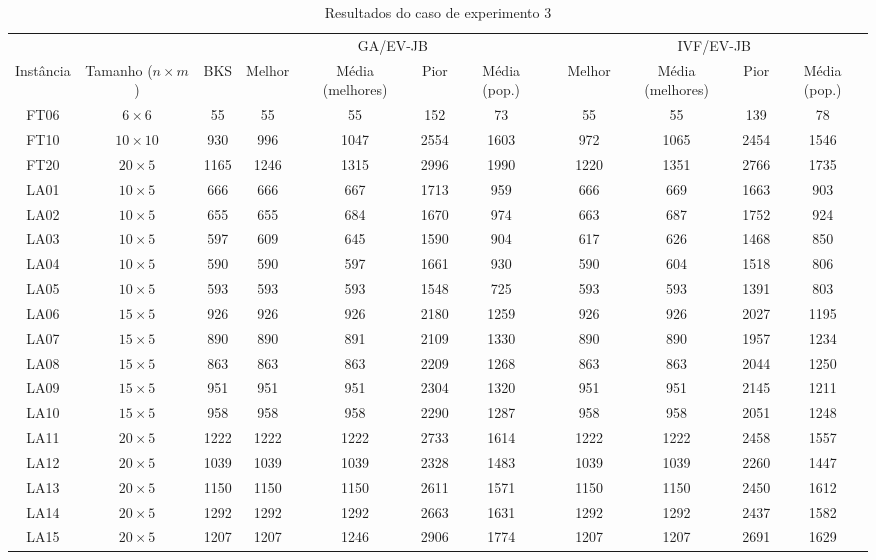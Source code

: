 \begin{sidewaystable}
\caption{Resultados do caso de experimento 3}
\centering
\label{experimento3}
\begin{tabular}{cccccccccccc}
\toprule
& & & \multicolumn{4}{c}{GA/EV-JB} & & \multicolumn{4}{c}{IVF/EV-JB} \\
\cmidrule(c){4-7}
\cmidrule(c){9-12}
Inst\^{a}ncia & Tamanho ($n \times m$) & BKS & Melhor & M\'{e}dia (melhores) & Pior & M\'{e}dia (pop.) & & Melhor & M\'{e}dia (melhores) & Pior & M\'{e}dia (pop.) \\
\midrule
FT06 & $6 \times 6$ & 55 & 55 & 55 & 152 & 73 & & 55 & 55 & 139 & 78 \\
FT10 & $10 \times 10$ & 930 & 996 & 1047 & 2554 & 1603 & & 972 & 1065 & 2454 & 1546 \\
FT20 & $20 \times 5$ & 1165 & 1246 & 1315 & 2996 & 1990 & & 1220 & 1351 & 2766 & 1735 \\
LA01 & $10 \times 5$ & 666 & 666 & 667 & 1713 & 959 & & 666 & 669 & 1663 & 903 \\
LA02 & $10 \times 5$ & 655 & 655 & 684 & 1670 & 974 & & 663 & 687 & 1752 & 924 \\
LA03 & $10 \times 5$ & 597 & 609 & 645 & 1590 & 904 & & 617 & 626 & 1468 & 850 \\
LA04 & $10 \times 5$ & 590 & 590 & 597 & 1661 & 930 & & 590 & 604 & 1518 & 806 \\
LA05 & $10 \times 5$ & 593 & 593 & 593 & 1548 & 725 & & 593 & 593 & 1391 & 803 \\
LA06 & $15 \times 5$ & 926 & 926 & 926 & 2180 & 1259 & & 926 & 926 & 2027 & 1195 \\
LA07 & $15 \times 5$ & 890 & 890 & 891 & 2109 & 1330 & & 890 & 890 & 1957 & 1234 \\
LA08 & $15 \times 5$ & 863 & 863 & 863 & 2209 & 1268 & & 863 & 863 & 2044 & 1250 \\
LA09 & $15 \times 5$ & 951 & 951 & 951 & 2304 & 1320 & & 951 & 951 & 2145 & 1211 \\
LA10 & $15 \times 5$ & 958 & 958 & 958 & 2290 & 1287 & & 958 & 958 & 2051 & 1248 \\
LA11 & $20 \times 5$ & 1222 & 1222 & 1222 & 2733 & 1614 & & 1222 & 1222 & 2458 & 1557 \\
LA12 & $20 \times 5$ & 1039 & 1039 & 1039 & 2328 & 1483 & & 1039 & 1039 & 2260 & 1447 \\
LA13 & $20 \times 5$ & 1150 & 1150 & 1150 & 2611 & 1571 & & 1150 & 1150 & 2450 & 1612 \\
LA14 & $20 \times 5$ & 1292 & 1292 & 1292 & 2663 & 1631 & & 1292 & 1292 & 2437 & 1582 \\
LA15 & $20 \times 5$ & 1207 & 1207 & 1246 & 2906 & 1774 & & 1207 & 1207 & 2691 & 1629 \\
\bottomrule
\end{tabular}
\end{sidewaystable}
